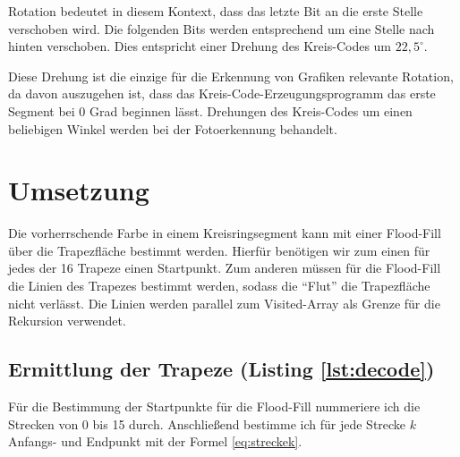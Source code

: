 Rotation bedeutet in diesem Kontext, dass das letzte Bit an die erste Stelle verschoben wird. Die folgenden Bits werden entsprechend um eine Stelle nach hinten verschoben. Dies entspricht einer Drehung des Kreis-Codes um \(22,5^{\circ}\).

Diese Drehung ist die einzige für die Erkennung von Grafiken relevante Rotation, da davon auszugehen ist, dass das Kreis-Code-Erzeugungsprogramm das erste Segment bei 0 Grad beginnen lässt. Drehungen des Kreis-Codes um einen beliebigen Winkel werden bei der Fotoerkennung behandelt.
\section{Umsetzung}
Die vorherrschende Farbe in einem Kreisringsegment kann mit einer Flood-Fill über die Trapezfläche bestimmt werden. Hierfür benötigen wir zum einen für jedes der 16 Trapeze einen Startpunkt.
Zum anderen müssen für die Flood-Fill die Linien des Trapezes bestimmt werden, sodass die "`Flut"' die Trapezfläche nicht verlässt. Die Linien werden parallel zum Visited-Array als Grenze für die Rekursion verwendet.

\subsection{Ermittlung der Trapeze (Listing \ref{lst:decode})}
Für die Bestimmung der Startpunkte für die Flood-Fill nummeriere ich die Strecken von 0 bis 15 durch. Anschließend bestimme ich für jede Strecke \(k\) Anfangs- und Endpunkt mit der Formel \eqref{eq:streckek}.

